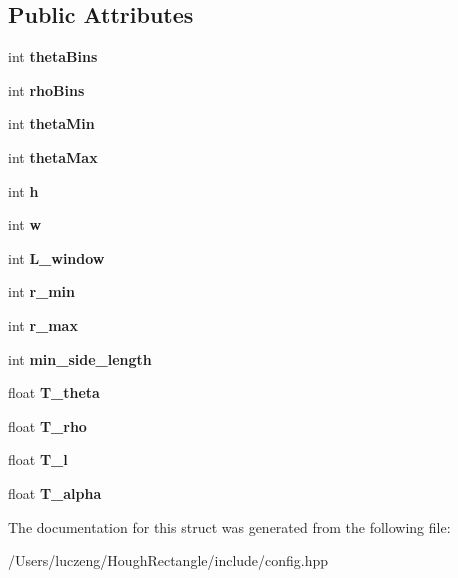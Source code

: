 \subsection*{Public Attributes}
\begin{DoxyCompactItemize}
\item 
\mbox{\label{struct_config_a8a9198cc2f760712b9af23a639fe7fd9}} 
int {\bfseries theta\+Bins}
\item 
\mbox{\label{struct_config_ac5d7d7fec26722d32ebf6ee687e6bb2f}} 
int {\bfseries rho\+Bins}
\item 
\mbox{\label{struct_config_abf2c439116f2df5f1d61a8e9cdee590c}} 
int {\bfseries theta\+Min}
\item 
\mbox{\label{struct_config_a05a9ea4a66142ecbb298630b2ae4cdd8}} 
int {\bfseries theta\+Max}
\item 
\mbox{\label{struct_config_a5b2b9c4653a61a87f7c38e5d2a09c892}} 
int {\bfseries h}
\item 
\mbox{\label{struct_config_a586760b5cf37ca1caf4fb4ff64835284}} 
int {\bfseries w}
\item 
\mbox{\label{struct_config_afd970e94ca70f78a79952fdaac0addbe}} 
int {\bfseries L\+\_\+window}
\item 
\mbox{\label{struct_config_a358399e2196fa59e0e0c471aadaa27e3}} 
int {\bfseries r\+\_\+min}
\item 
\mbox{\label{struct_config_ad2a4d636461b5ebc4ae6b47dfa25e494}} 
int {\bfseries r\+\_\+max}
\item 
\mbox{\label{struct_config_abd64a578bf8f122031c715eab520cded}} 
int {\bfseries min\+\_\+side\+\_\+length}
\item 
\mbox{\label{struct_config_a97e38d442cb4d08147ba7c6594b94a9b}} 
float {\bfseries T\+\_\+theta}
\item 
\mbox{\label{struct_config_aa1b90d1d6fdbdb60447bebd13b3e62ae}} 
float {\bfseries T\+\_\+rho}
\item 
\mbox{\label{struct_config_a5ea6926775cac2fea6998035deda3967}} 
float {\bfseries T\+\_\+l}
\item 
\mbox{\label{struct_config_abb4ade28d990d7dc8bc03f01738d004a}} 
float {\bfseries T\+\_\+alpha}
\end{DoxyCompactItemize}


The documentation for this struct was generated from the following file\+:\begin{DoxyCompactItemize}
\item 
/\+Users/luczeng/\+Hough\+Rectangle/include/config.\+hpp\end{DoxyCompactItemize}
